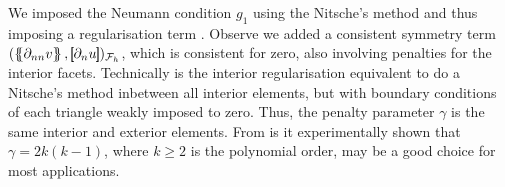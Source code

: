 \begin{remark}
We imposed the Neumann condition $g_{1}$ using the Nitsche's method and thus imposing a regularisation term \cite{nitsche1971variationsprinzip}. Observe we added a consistent symmetry term $( \mean{ \partial _{n n} v }, \jump{ \partial _{n}u }      )_{\mathcal{F}_{h}}$,
which is consistent for zero, also involving penalties for the interior facets. Technically is the interior regularisation equivalent to do a Nitsche's method inbetween all interior elements, but with boundary conditions of each triangle weakly
imposed to zero. Thus, the penalty parameter $\gamma$  is the same interior and exterior elements. From \cite{brenner2012quadratic, brenner2012} is it experimentally shown that $\gamma = 2k ( k-1 ) $, where $k\ge 2$ is the polynomial order, may be
a good choice for most applications.
\end{remark}




